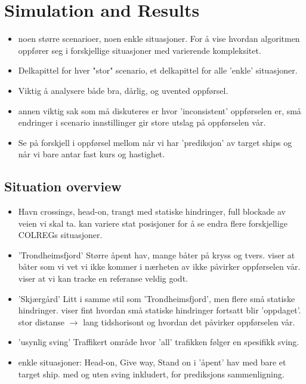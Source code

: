 \section{Simulation and Results}
\begin{itemize}
    \item noen større scenarioer, noen enkle situasjoner. For å vise hvordan algoritmen oppfører seg i forskjellige situasjoner med varierende kompleksitet.
    \item Delkapittel for hver "stor" scenario, et delkapittel for alle 'enkle' situasjoner.
    \item Viktig å analysere både bra, dårlig, og uvented oppførsel.
    \item annen viktig sak som må diskuteres er hvor 'inconsistent' oppførselen er, små endringer i scenario innstillinger gir store utslag på oppførselen vår.
    \item Se på forskjell i oppførsel mellom når vi har 'prediksjon' av target ships og når vi bare antar fast kurs og hastighet.
\end{itemize}

\subsection{Situation overview}
\begin{itemize}
    \item Havn
    \subitem crossings, head-on, trangt med statiske hindringer, full blockade av veien vi skal ta.
    \subitem kan variere stat posisjoner for å se endra flere forskjellige COLREGs situasjoner.
    \item 'Trondheimsfjord'
    \subitem Større åpent hav, mange båter på kryss og tvers.
    \subitem viser at båter som vi vet vi ikke kommer i nærheten av ikke påvirker oppførselen vår.
    \subitem viser at vi kan tracke en referanse veldig godt.
    \item 'Skjærgård'
    \subitem Litt i samme stil som 'Trondheimsfjord', men flere små statiske hindringer.
    \subitem viser fint hvordan små statiske hindringer fortsatt blir 'oppdaget'.
    \subitem stor distanse $\rightarrow$ lang tidshorisont og hvordan det påvirker oppførselen vår.
    \item 'usynlig sving'
    \subitem Traffikert område hvor 'all' trafikken følger en spesifikk sving.
    \item enkle situasjoner:
    \subitem Head-on, Give way, Stand on i 'åpent' hav med bare et target ship.
    \subitem med og uten sving inkludert, for prediksjons sammenligning.
\end{itemize}

